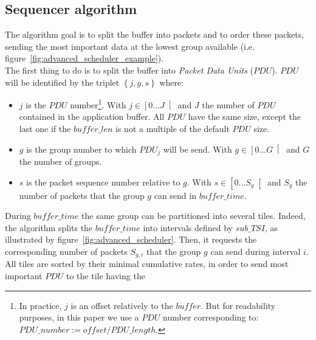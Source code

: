 \documentclass[a4paper]{article}
\begin{document}
    \subsection{Sequencer algorithm}
        The algorithm goal is to split the buffer into packets and to order
        these packets, sending the most important data at the lowest group
        available (i.e.  figure~\ref{fig:advanced_scheduler_example}).
        \\
        The first thing to do is to split the buffer into \textit{Packet Data
            Units} ($PDU$).  $PDU$ will be identified by the triplet $\left\{j,
            g, s\right\}$ where:
        \begin{itemize}
            \item{
                $j$ is the $PDU$ number\footnote{
                        In practice, $j$ is an offset relatively to the
                            $buffer$. But for readability purposes, in this
                            paper we use a $PDU$ number corresponding to:
                            \\
                            $PDU\_number := offset / PDU\_length$.
                    }.
                    With $j \in \left[0...J\right[$ and $J$ the number of $PDU$
                        contained in the application buffer. All $PDU$ have
                        the same size, except the last one if the
                        $buffer\_len$ is not a multiple of the default $PDU$
                        size.
            }
            \item{
                $g$ is the group number to which $PDU_j$ will be send. With $g
                    \in \left[0...G\right[$ and $G$ the number of groups.
            }
            \item{
                $s$ is the packet sequence number relative to $g$.  With $s \in
                    \left[0...S_g\right[$ and $S_g$ the number of packets that
                    the group $g$ can send in $buffer\_time$.
            }
        \end{itemize}
        During $buffer\_time$ the same group can be partitioned into several
        tiles.  Indeed, the algorithm splits the $buffer\_time$ into intervals
        defined by $sub\_TSI$, as illustrated by
        figure~\ref{fig:advanced_scheduler}.  Then, it requests the
        corresponding number of packets $S_{g,i}$ that the group $g$ can send
        during interval $i$.  All tiles are sorted by their minimal cumulative
        rates, in order to send most important $PDU$ to the tile having the
\end{document}

